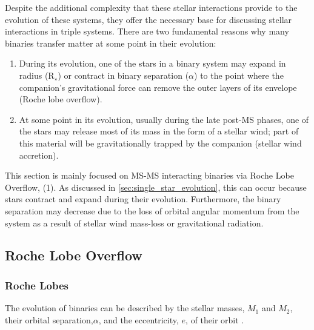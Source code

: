 Despite the additional complexity that these stellar interactions provide to the evolution of these systems, they offer the necessary base for discussing stellar interactions in triple systems.  There are two fundamental reasons why many binaries transfer matter at some point in their evolution:

\begin{enumerate}
    \item During its evolution, one of the stars in a binary system may expand in radius (R$_{\star}$) or contract in binary separation (${\alpha}$) to the point where the companion's gravitational force can remove the outer layers of its envelope (Roche lobe overflow).
    \item At some point in its evolution, usually during the late post-MS phases, one of the stars may release most of its mass in the form of a stellar wind; part of this material will be gravitationally trapped by the companion (stellar wind accretion). 
\end{enumerate}

This section is mainly focused on MS-MS interacting binaries via Roche Lobe Overflow, (1). As discussed in \cref{sec:single_star_evolution}, this can occur because stars contract and expand during their evolution. Furthermore, the binary separation may decrease due to the loss of orbital angular momentum from the system as a result of stellar wind mass-loss or gravitational radiation. 


\subsection{Roche Lobe Overflow}

\subsubsection{Roche Lobes}

The evolution of binaries can be described by the stellar masses, $M_1$ and $M_2$, their orbital separation,$\alpha$, and the eccentricity, $e$, of their orbit \citep{postnov2014evolution,sana2012binary,toonen2014popcorn}.

